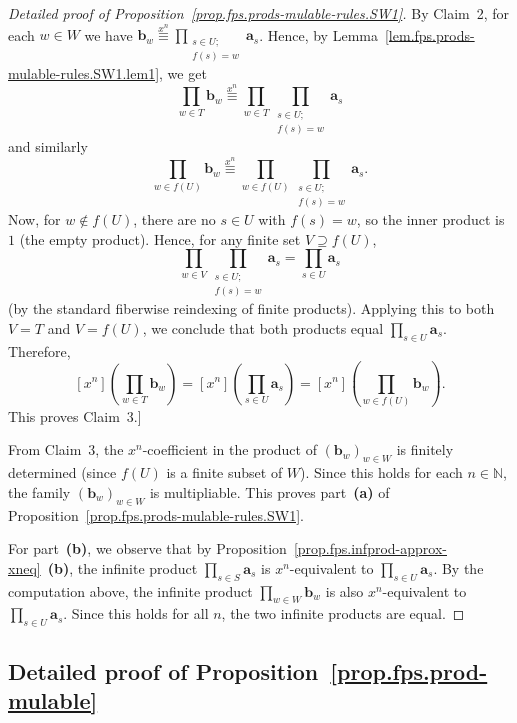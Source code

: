 \begin{proof}[Detailed proof of Proposition~\ref{prop.fps.prods-mulable-rules.SW1}]
By Claim~2, for each $w \in W$ we have
$\mathbf{b}_{w} \overset{x^n}{\equiv}
\prod_{\substack{s \in U;\\ f(s) = w}} \mathbf{a}_{s}$.
Hence, by Lemma~\ref{lem.fps.prods-mulable-rules.SW1.lem1}, we get
\[
\prod_{w \in T} \mathbf{b}_w \overset{x^n}{\equiv}
\prod_{w \in T} \prod_{\substack{s \in U;\\ f(s) = w}} \mathbf{a}_{s}
\]
and similarly
\[
\prod_{w \in f(U)} \mathbf{b}_w \overset{x^n}{\equiv}
\prod_{w \in f(U)} \prod_{\substack{s \in U;\\ f(s) = w}} \mathbf{a}_{s}.
\]
Now, for $w \notin f(U)$, there are no $s \in U$ with $f(s) = w$, so
the inner product is $1$ (the empty product). Hence, for any finite set
$V \supseteq f(U)$,
\[
\prod_{w \in V} \prod_{\substack{s \in U;\\ f(s) = w}} \mathbf{a}_{s}
= \prod_{s \in U} \mathbf{a}_{s}
\]
(by the standard fiberwise reindexing of finite products). Applying this
to both $V = T$ and $V = f(U)$, we conclude that both products equal
$\prod_{s \in U} \mathbf{a}_{s}$. Therefore,
\[
\left[x^n\right] \left(\prod_{w \in T} \mathbf{b}_w\right)
= \left[x^n\right] \left(\prod_{s \in U} \mathbf{a}_s\right)
= \left[x^n\right] \left(\prod_{w \in f(U)} \mathbf{b}_w\right).
\]
This proves Claim~3.]

From Claim~3, the $x^n$-coefficient in the product of
$\left(\mathbf{b}_w\right)_{w \in W}$ is finitely determined (since
$f(U)$ is a finite subset of $W$). Since this holds for each
$n \in \mathbb{N}$, the family
$\left(\mathbf{b}_w\right)_{w \in W}$ is multipliable. This proves
part~\textbf{(a)} of Proposition~\ref{prop.fps.prods-mulable-rules.SW1}.

For part~\textbf{(b)}, we observe that by
Proposition~\ref{prop.fps.infprod-approx-xneq}~\textbf{(b)}, the
infinite product $\prod_{s \in S} \mathbf{a}_s$ is $x^n$-equivalent to
$\prod_{s \in U} \mathbf{a}_s$. By the computation above, the infinite
product $\prod_{w \in W} \mathbf{b}_w$ is also $x^n$-equivalent to
$\prod_{s \in U} \mathbf{a}_s$. Since this holds for all $n$, the two
infinite products are equal.
\end{proof}

\subsection{Detailed proof of Proposition~\ref{prop.fps.prod-mulable}}

